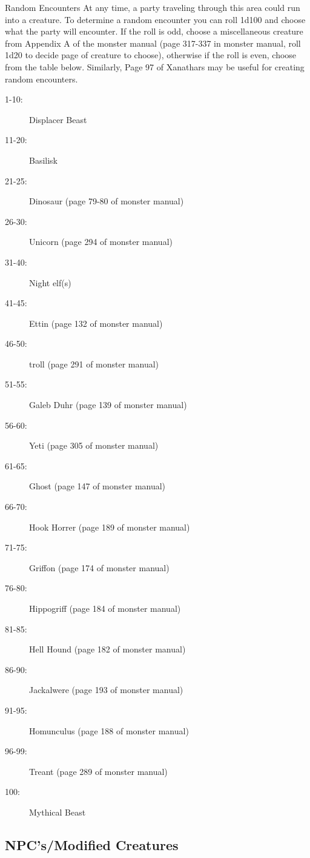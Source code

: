 \begin{commentbox}{Random Encounters}
	At any time, a party traveling through this area could run into a creature. To determine a random encounter you can roll 1d100 and choose what the party will encounter. If the roll is odd, choose a miscellaneous creature from Appendix A of the monster manual (page 317-337 in monster manual, roll 1d20 to decide page of creature to choose), otherwise if the roll is even, choose from the table below. Similarly, Page 97 of Xanathars may be useful for creating random encounters.
	\begin{description}
		\item[1-10:] Displacer Beast
		\item[11-20:] Basilisk
		\item[21-25:] Dinosaur (page 79-80 of monster manual)
		\item[26-30:] Unicorn (page 294 of monster manual)
		\item[31-40:] Night elf(s)
		\item[41-45:] Ettin (page 132 of monster manual)
		\item[46-50:] troll (page 291 of monster manual)
		\item[51-55:] Galeb Duhr (page 139 of monster manual)
		\item[56-60:] Yeti (page 305 of monster manual)
		\item[61-65:] Ghost (page 147 of monster manual)
		\item[66-70:] Hook Horrer (page 189 of monster manual)
		\item[71-75:] Griffon (page 174 of monster manual)
		\item[76-80:] Hippogriff (page 184 of monster manual)
		\item[81-85:] Hell Hound (page 182 of monster manual)
		\item[86-90:] Jackalwere (page 193 of monster manual)
		\item[91-95:] Homunculus (page 188 of monster manual)
		\item[96-99:] Treant (page 289 of monster manual)
		\item[100:] Mythical Beast
	\end{description}
\end{commentbox}

\subsection{NPC's/Modified Creatures}

